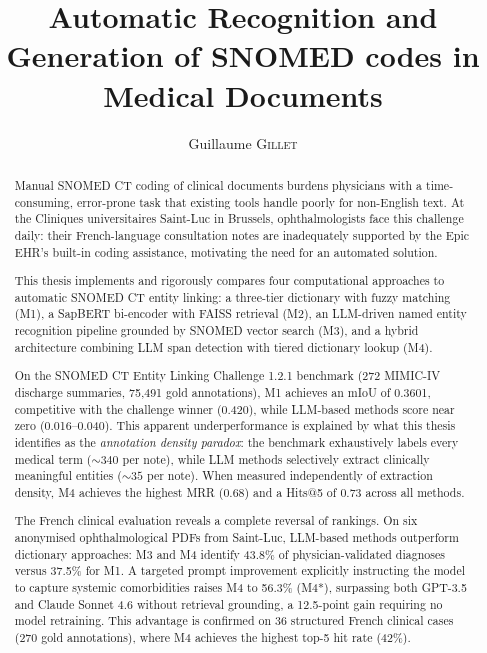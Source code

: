\documentclass{EPL-master-thesis-covers-EN}
\title{Automatic Recognition and Generation of SNOMED codes in Medical Documents}
\author{Guillaume \textsc{Gillet}}
\begin{document}
    \hypersetup{pageanchor=false}
    \maketitle
    \clearpage\thispagestyle{empty}\mbox{}\clearpage

    \begin{abstract}
    \thispagestyle{plain}

Manual SNOMED CT coding of clinical documents burdens physicians with a time-consuming, error-prone task that existing tools handle poorly for non-English text. At the Cliniques universitaires Saint-Luc in Brussels, ophthalmologists face this challenge daily: their French-language consultation notes are inadequately supported by the Epic EHR's built-in coding assistance, motivating the need for an automated solution.

This thesis implements and rigorously compares four computational approaches to automatic SNOMED CT entity linking: a three-tier dictionary with fuzzy matching (M1), a SapBERT bi-encoder with FAISS retrieval (M2), an LLM-driven named entity recognition pipeline grounded by SNOMED vector search (M3), and a hybrid architecture combining LLM span detection with tiered dictionary lookup (M4).

On the SNOMED CT Entity Linking Challenge 1.2.1 benchmark (272 MIMIC-IV discharge summaries, 75{,}491 gold annotations), M1 achieves an mIoU of 0.3601, competitive with the challenge winner (0.420), while LLM-based methods score near zero (0.016--0.040). This apparent underperformance is explained by what this thesis identifies as the \emph{annotation density paradox}: the benchmark exhaustively labels every medical term (${\sim}340$ per note), while LLM methods selectively extract clinically meaningful entities (${\sim}35$ per note). When measured independently of extraction density, M4 achieves the highest MRR (0.68) and a Hits@5 of 0.73 across all methods.

The French clinical evaluation reveals a complete reversal of rankings. On six anonymised ophthalmological PDFs from Saint-Luc, LLM-based methods outperform dictionary approaches: M3 and M4 identify 43.8\% of physician-validated diagnoses versus 37.5\% for M1. A targeted prompt improvement explicitly instructing the model to capture systemic comorbidities raises M4 to 56.3\% (M4*), surpassing both GPT-3.5 and Claude Sonnet 4.6 without retrieval grounding, a 12.5-point gain requiring no model retraining. This advantage is confirmed on 36 structured French clinical cases (270 gold annotations), where M4 achieves the highest top-5 hit rate (42\%).


\end{abstract}
\end{document}
